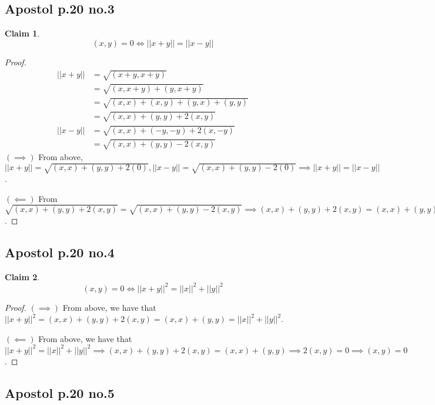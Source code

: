 \documentclass[12pt,letterpaper]{article}
\theoremstyle{definition}
\newtheorem*{claim}{Claim}
\begin{document}
\subsection*{Apostol p.20 no.3}

\begin{claim}
  \[
    (x, y) = 0 \iff ||x + y||  = ||x - y||
  \]
\end{claim}

\begin{proof}
  \begin{align*}
    ||x + y|| &= \sqrt{(x+y, x+y)} \\
              &= \sqrt{(x, x+y) + (y, x+y)} \\
              &= \sqrt{(x, x) + (x, y) + (y, x) + (y, y)} \\
              &= \sqrt{(x,x) + (y,y) + 2(x, y)} \\
    ||x - y|| &= \sqrt{(x, x) + (-y, -y) + 2(x, -y)} \\
              &= \sqrt{(x,x) + (y, y) - 2(x, y)}
  \end{align*}
  $(\implies)$ From above, $||x + y|| = \sqrt{(x, x) + (y,y) + 2(0)}, ||x - y||
  = \sqrt{(x, x) + (y, y) - 2(0)} \implies ||x + y|| = ||x - y||$.

  $(\impliedby)$ From $\sqrt{(x, x) + (y,y) + 2(x, y)} = \sqrt{(x, x) + (y,y) -
    2(x,y)} \implies (x,x) + (y,y) + 2(x,y) = (x,x) + (y,y) - 2(x,y) \implies 2(x,y) =
  -2(x,y) \implies 4(x,y) = 0 \implies (x,y) = 0$.
\end{proof}

\subsection*{Apostol p.20 no.4}

\begin{claim}
  \[
    (x, y) = 0 \iff ||x + y||^2 = ||x||^2 + ||y||^2
  \]
\end{claim}

\begin{proof}
  $(\implies)$ From above, we have that $||x + y||^2 = (x,x) + (y,y) + 2(x,y) = (x,x) + (y,y)
  = ||x||^2 + ||y||^2$.

  $(\impliedby)$ From above, we have that $||x+y||^2 = ||x||^2 + ||y||^2
  \implies (x,x) + (y,y) + 2(x,y) = (x,x) + (y,y) \implies 2(x,y) = 0 \implies
  (x,y) =0$.
\end{proof}

\subsection*{Apostol p.20 no.5}
\end{document}
